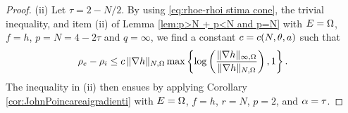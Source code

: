 \documentclass[a4paper,10pt]{amsart}
\numberwithin{equation}{section}
\begin{document}
\begin{proof}
	(ii)
	Let $\tau=2-N/2$. By using \eqref{eq:rhoe-rhoi stima cone}, the trivial inequality, and item (ii) of Lemma \ref{lem:p>N + p<N and p=N} with $E=\Omega$, $f=h$, $p=N = 4 - 2 \tau$ and $q=\infty$, we find a constant $c=c(N, \theta , a)$ such that
%
%
%
$$
\rho_e - \rho_i \le c \, \Vert \nabla h \Vert_{N, \Omega } \max \left\lbrace \log\left( \frac{ \Vert \nabla h \Vert_{ \infty , \Omega} }{\Vert \nabla h \Vert_{N, \Omega} }\right) , 1 \right\rbrace .
$$
The inequality in (ii) then ensues by applying Corollary \ref{cor:JohnPoincareaigradienti} with $E=\Omega$, $f= h$, $r=N$,
$p=2$, and $\alpha=\tau$.
\end{proof}
\end{document}
